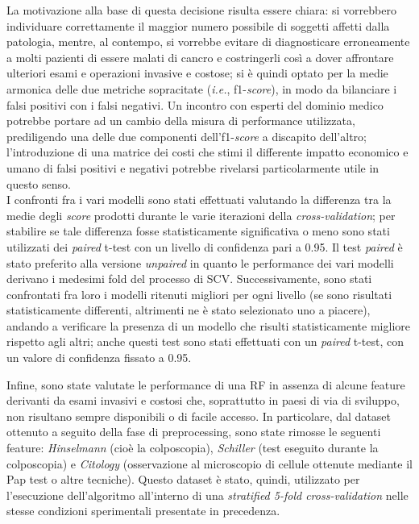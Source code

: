 La motivazione alla base di questa decisione risulta essere chiara: si vorrebbero individuare correttamente il maggior numero possibile di soggetti affetti dalla patologia, mentre, al contempo, si vorrebbe evitare di diagnosticare erroneamente a molti pazienti di essere malati di cancro e costringerli così a dover affrontare ulteriori esami e operazioni invasive e costose; si è quindi optato per la medie armonica delle due metriche sopracitate (\textit{i.e.}, f1-\textit{score}), in modo da bilanciare i falsi positivi con i falsi negativi.
Un incontro con esperti del dominio medico potrebbe portare ad un cambio della misura di performance utilizzata, prediligendo una delle due componenti dell'f1-\textit{score} a discapito dell'altro; l'introduzione di una matrice dei costi che stimi il differente impatto economico e umano di falsi positivi e negativi potrebbe rivelarsi particolarmente utile in questo senso.\\
I confronti fra i vari modelli sono stati effettuati valutando la differenza tra la medie degli \textit{score} prodotti durante le varie iterazioni della \textit{cross-validation}; per stabilire se tale differenza fosse statisticamente significativa o meno sono stati utilizzati dei \textit{paired} t-test con un livello di confidenza pari a 0.95. Il test \textit{paired} è stato preferito alla versione \textit{unpaired} in quanto le performance dei vari modelli derivano i medesimi fold del processo di SCV.
Successivamente, sono stati confrontati fra loro i modelli ritenuti migliori per ogni livello (se sono risultati statisticamente differenti, altrimenti ne è stato selezionato uno a piacere), andando a verificare la presenza di un modello che risulti statisticamente migliore rispetto agli altri; anche questi test sono stati effettuati con un \textit{paired} t-test, con un valore di confidenza fissato a 0.95.

Infine, sono state valutate le performance di una RF in assenza di alcune feature derivanti da esami invasivi e costosi che, soprattutto in paesi di via di sviluppo, non risultano sempre disponibili o di facile accesso.
In particolare, dal dataset ottenuto a seguito della fase di preprocessing, sono state rimosse le seguenti feature: \textit{Hinselmann} (cioè la colposcopia), \textit{Schiller} (test eseguito durante la colposcopia) e \textit{Citology} (osservazione  al microscopio di cellule ottenute mediante il Pap test o altre tecniche).
Questo dataset è stato, quindi, utilizzato per l'esecuzione dell'algoritmo all'interno di una \textit{stratified 5-fold cross-validation} nelle stesse condizioni sperimentali presentate in precedenza.